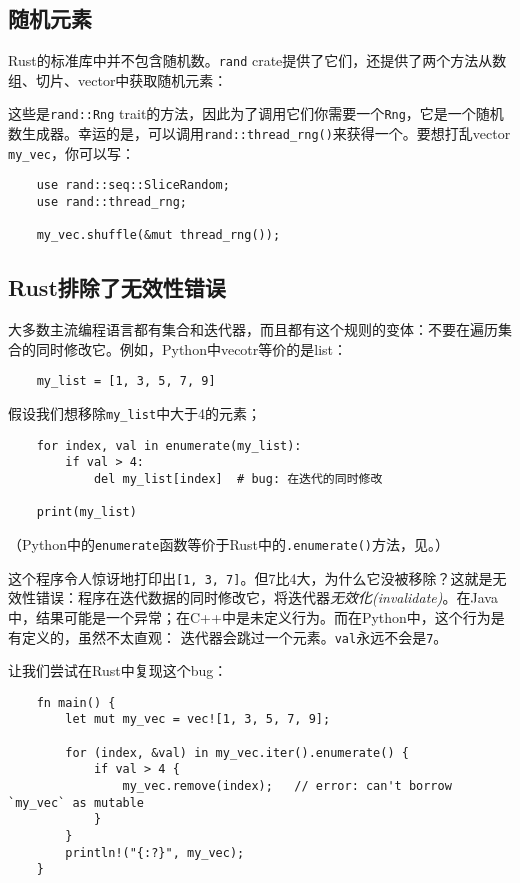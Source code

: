 \subsection{随机元素}
Rust的标准库中并不包含随机数。\texttt{rand} crate提供了它们，还提供了两个方法从数组、切片、vector中获取随机元素：



这些是\texttt{rand::Rng} trait的方法，因此为了调用它们你需要一个\texttt{Rng}，它是一个随机数生成器。幸运的是，可以调用\texttt{rand::thread\_rng()}来获得一个。要想打乱vector \texttt{my\_vec}，你可以写：
\begin{verbatim}
    use rand::seq::SliceRandom;
    use rand::thread_rng;

    my_vec.shuffle(&mut thread_rng());
\end{verbatim}

\subsection{Rust排除了无效性错误}
大多数主流编程语言都有集合和迭代器，而且都有这个规则的变体：不要在遍历集合的同时修改它。例如，Python中vecotr等价的是list：
\begin{verbatim}
    my_list = [1, 3, 5, 7, 9]
\end{verbatim}

假设我们想移除\texttt{my\_list}中大于4的元素；
\begin{verbatim}
    for index, val in enumerate(my_list):
        if val > 4:
            del my_list[index]  # bug: 在迭代的同时修改
    
    print(my_list)
\end{verbatim}
（Python中的\texttt{enumerate}函数等价于Rust中的\texttt{.enumerate()}方法，见。）

这个程序令人惊讶地打印出\texttt{[1, 3, 7]}。但7比4大，为什么它没被移除？这就是无效性错误：程序在迭代数据的同时修改它，将迭代器\emph{无效化(invalidate)}。在Java中，结果可能是一个异常；在C++中是未定义行为。而在Python中，这个行为是有定义的，虽然不太直观：
迭代器会跳过一个元素。\texttt{val}永远不会是\texttt{7}。

让我们尝试在Rust中复现这个bug：
\begin{verbatim}
    fn main() {
        let mut my_vec = vec![1, 3, 5, 7, 9];
        
        for (index, &val) in my_vec.iter().enumerate() {
            if val > 4 {
                my_vec.remove(index);   // error: can't borrow `my_vec` as mutable
            }
        }
        println!("{:?}", my_vec);
    }
\end{verbatim}

